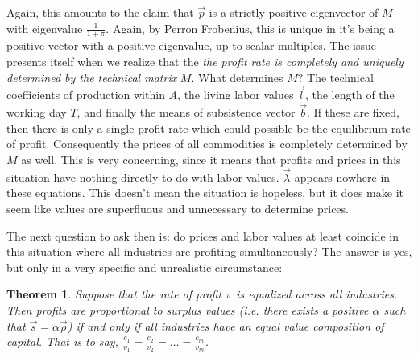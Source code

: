 \documentclass{article}
\theoremstyle{definition}
\theoremstyle{plain}
\theoremstyle{theorem}
\newtheorem{theorem}{Theorem}[section]
\begin{document}
Again, this amounts to the claim that $\vec{p}$ is a strictly positive eigenvector of $M$ with eigenvalue $\frac{1}{1+\pi}$. Again, by Perron Frobenius, this is unique in it's being a positive vector with a positive eigenvalue, up to scalar multiples. The issue presents itself when we realize that the \emph{the profit rate is completely and uniquely determined by the technical matrix} $M$. What determines $M$? The technical coefficients of production within $A$, the living labor values $\vec{l}$, the length of the working day $T$, and finally the means of subsistence vector $\vec{b}$. If these are fixed, then there is only a single profit rate which could possible be the equilibrium rate of profit. Consequently the prices of all commodities is completely determined by $M$ as well. This is very concerning, since it means that profits and prices in this situation have nothing directly to do with labor values. $\vec{\lambda}$ appears nowhere in these equations. This doesn't mean the situation is hopeless, but it does make it seem like values are superfluous and unnecessary to determine prices. \par 
The next question to ask then is: do prices and labor values at least coincide in this situation where all industries are profiting simultaneously? The answer is yes, but only in a very specific and unrealistic circumstance: 
\begin{theorem}
	Suppose that the rate of profit $\pi$ is equalized across all industries. Then profits are proportional to surplus values (i.e. there exists a positive $\alpha$ such that $\vec{s} = \alpha\vec{\rho}$) if and only if all industries have an equal value composition of capital. That is to say, $\frac{c_1}{v_1} = \frac{c_2}{v_2} = \ldots = \frac{c_m}{v_m}$. 
\end{theorem}
\end{document}
